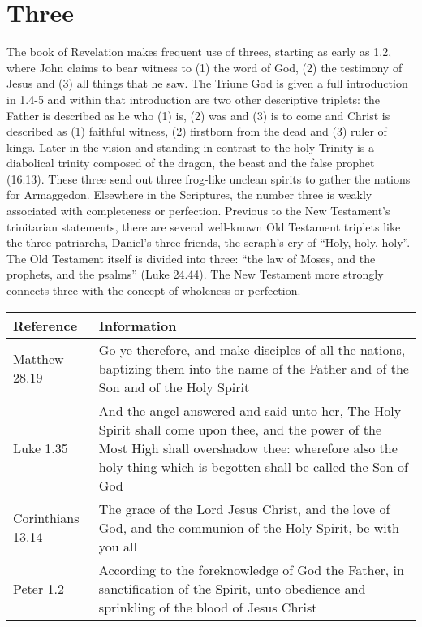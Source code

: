 \section*{Three}
The book of Revelation makes frequent use of threes, starting as early as 1.2, where John claims to bear witness to (1) the word of God, (2) the testimony of Jesus and (3) all things that he saw. The Triune God is given a full introduction in 1.4-5 and within that introduction are two other descriptive triplets: the Father is described as he who (1) is, (2) was and (3) is to come and Christ is described as (1) faithful witness, (2) firstborn from the dead and (3) ruler of kings. Later in the vision and standing in contrast to the holy Trinity is a diabolical trinity composed of the dragon, the beast and the false prophet (16.13). These three send out three frog-like unclean spirits to gather the nations for Armaggedon.
\newline\newline
Elsewhere in the Scriptures, the number three is weakly associated with completeness or perfection. Previous to the New Testament's trinitarian statements, there are several well-known Old Testament triplets like the three patriarchs, Daniel's three friends, the seraph's cry of ``Holy, holy, holy''. The Old Testament itself is divided into three: ``the law of Moses, and the prophets, and the psalms'' (Luke 24.44). The New Testament more strongly connects three with the concept of wholeness or perfection.  
\newline\newline
\begin{tabularx}{\textwidth}{l X}
\toprule
\textbf{Reference} & \textbf{Information}\\
\midrule
Matthew 28.19 & Go ye therefore, and make disciples of all the nations, baptizing them into the name of the Father and of the Son and of the Holy Spirit \\
\addlinespace
Luke 1.35 &  And the angel answered and said unto her, The Holy Spirit shall come upon thee, and the power of the Most High shall overshadow thee: wherefore also the holy thing which is begotten shall be called the Son of God \\
\addlinespace
2 Corinthians 13.14 & The grace of the Lord Jesus Christ, and the love of God, and the communion of the Holy Spirit, be with you all \\
\addlinespace
1 Peter 1.2 & According to the foreknowledge of God the Father, in sanctification of the Spirit, unto obedience and sprinkling of the blood of Jesus Christ \\
\bottomrule
\end{tabularx}

